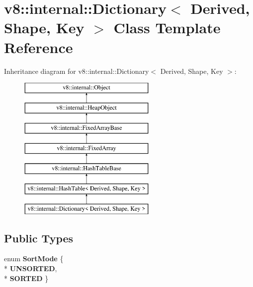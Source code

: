 \hypertarget{classv8_1_1internal_1_1_dictionary}{}\section{v8\+:\+:internal\+:\+:Dictionary$<$ Derived, Shape, Key $>$ Class Template Reference}
\label{classv8_1_1internal_1_1_dictionary}
Inheritance diagram for v8\+:\+:internal\+:\+:Dictionary$<$ Derived, Shape, Key $>$\+:\begin{figure}[H]
\begin{center}
\leavevmode
\includegraphics[height=7.000000cm]{classv8_1_1internal_1_1_dictionary}
\end{center}
\end{figure}
\subsection*{Public Types}
\begin{DoxyCompactItemize}
\item 
enum {\bfseries Sort\+Mode} \{ \\*
{\bfseries U\+N\+S\+O\+R\+T\+ED}, 
\\*
{\bfseries S\+O\+R\+T\+ED}
 \}\hypertarget{classv8_1_1internal_1_1_dictionary_a0090026b780259a31ce767ac796c6200}{}\label{classv8_1_1internal_1_1_dictionary_a0090026b780259a31ce767ac796c6200}

\end{DoxyCompactItemize}
